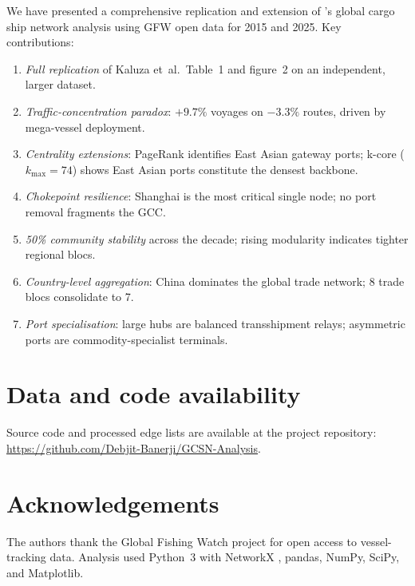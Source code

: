 \documentclass[a4paper,10pt,twocolumn]{article}
\newcommand{\projectrepo}{\url{https://github.com/Debjit-Banerji/GCSN-Analysis}}
\begin{document}
We have presented a comprehensive replication and extension of
\citeauthor{Kaluza2010}'s global cargo ship network analysis using
GFW open data for 2015 and 2025.
Key contributions:
\begin{enumerate}
  \item \textit{Full replication} of Kaluza et~al.\ Table~1 and
        figure~2 on an independent, larger dataset.
  \item \textit{Traffic-concentration paradox}: $+9.7\%$ voyages on
        $-3.3\%$ routes, driven by mega-vessel deployment.
  \item \textit{Centrality extensions}: PageRank identifies East
        Asian gateway ports; k-core ($k_\text{max}=74$) shows
        East Asian ports constitute the densest backbone.
  \item \textit{Chokepoint resilience}: Shanghai is the most
        critical single node; no port removal fragments the GCC.
  \item \textit{50\% community stability} across the decade; rising
        modularity indicates tighter regional blocs.
  \item \textit{Country-level aggregation}: China dominates the
        global trade network; 8 trade blocs consolidate to 7.
  \item \textit{Port specialisation}: large hubs are balanced
        transshipment relays; asymmetric ports are commodity-specialist
        terminals.
\end{enumerate}

\section*{Data and code availability}

Source code and processed edge lists are available at the project
repository: \projectrepo.

\section*{Acknowledgements}

The authors thank the Global Fishing Watch project for open access
to vessel-tracking data.
Analysis used Python~3 with NetworkX \citep{Hagberg2008}, pandas,
NumPy, SciPy, and Matplotlib.



\end{document}

